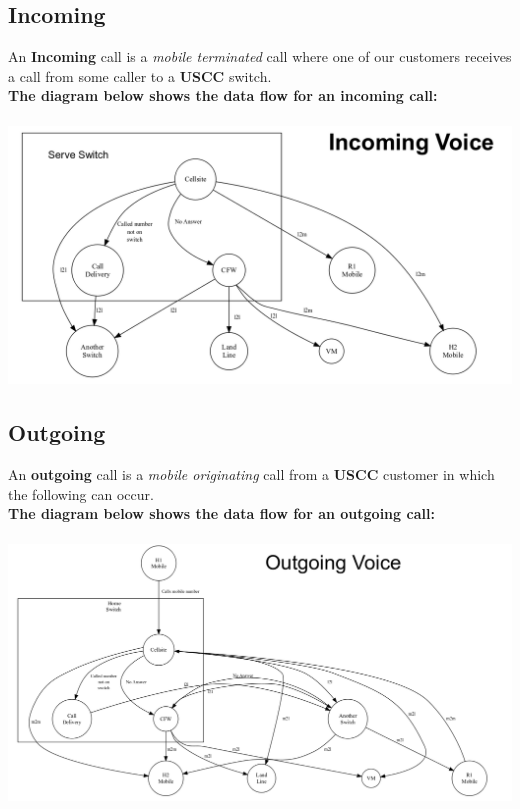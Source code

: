 \documentclass[12pt,twoside]{article}
\begin{document}
\begin{landscape}  
\subsection{Incoming}
\label{sec-5-2}

   An \textbf{Incoming} call is a \emph{mobile terminated} call where one of our customers receives a call from some caller to a \textbf{USCC} switch.\\
   \textbf{The diagram below shows the data flow for an incoming call:}\\ \\
   \includegraphics[width=20cm]{Pictures/incoming.png}

\end{landscape} 
\newpage
\begin{landscape}  
\subsection{Outgoing}
\label{sec-5-3}

   An \textbf{outgoing} call is a \emph{mobile originating} call from a \textbf{USCC}
   customer in which the following can occur. \\
   \textbf{The diagram below shows the data flow for an outgoing call:} \\ \\


    \includegraphics[width=23cm]{Pictures/outgoing.png}

\end{landscape} 
\newpage
\end{document}
